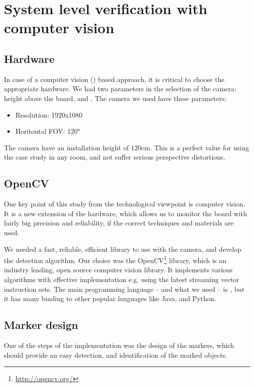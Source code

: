 \section{System level verification with computer vision}

\subsection{Hardware}
\label{sec:case_study:hardware}

In case of a computer vision () based approach, it is critical to choose the appropriate hardware. We had two parameters in the selection of the camera: height above the board, and . The camera we used have these parameters:
\begin{itemize}
	\item Resolution: 1920x1080
	\item Horitontal FOV: \ang{120}
\end{itemize}

The camera have an installation height of $120$\si{\centi\meter}. This is a perfect value for using the case study in any room, and not suffer serious perspective distortions.

\subsection{OpenCV}

One key point of this study from the technological viewpoint is computer vision. It is a new extension of the hardware, which allows us to monitor the board with fairly big precision and reliability, if the correct techniques and materials are used.

We needed a fast, reliable, efficient library to use with the camera, and develop the detection algorithm. Our choice was the OpenCV\footnote{\url{http://opencv.org/}} library, which is an industry leading, open source computer vision library. It implements various algorithms with effective implementation e.g. using the latest streaming vector instruction sets. The main programming language -- and what we used -- is , but it has many binding to other popular languages like Java, and Python.

\subsection{Marker design}

One of the steps of the  implementation was the design of the markers, which should provide an easy detection, and identification of the marked objects.

